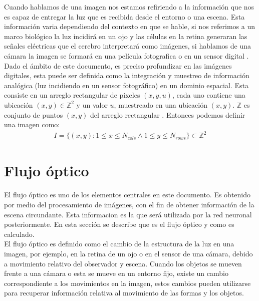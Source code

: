 \documentclass{iccmemoria}
\begin{document}
Cuando hablamos de una imagen nos estamos refiriendo a la información que nos es capaz de entregar la luz que es recibida desde el entorno o una escena. Esta información varia dependiendo del contexto en que se hable, si nos referimos a un marco biológico la luz incidirá en un ojo y las células en la retina generaran las señales eléctricas que el cerebro interpretará como imágenes, si hablamos de una cámara la imagen se formará en una película fotografica o en un sensor digital \cite{bradski2008learning}.\\

Dado el ámbito de este documento, es preciso profundizar en las imágenes digitales, esta puede ser definida como la integración y muestreo de información analógica (luz incidiendo en un sensor fotográfico) en un dominio espacial. Esta consiste en un arreglo rectangular de pixeles $(x, y, u)$, cada uno contiene una ubicación $(x, y) \in \mathbb{Z}^2 $ y un valor $u$, muestreado en una ubicación $(x, y)$. $\mathbb{Z}$ es conjunto de puntos $(x, y)$ del arreglo rectangular \cite{klette2014concise}. Entonces podemos definir una imagen como:
\begin{equation}
	\begin{split}
	I = \lbrace (x, y) : 1 \leq  x \leq N_{cols} \wedge 1 \leq y \leq N_{rows} \rbrace \subset \mathbb{Z}^2
	\end{split}
\end{equation}

\section{Flujo óptico}\label{flujo_optico}

El flujo óptico es uno de los elementos centrales en este documento. Es obtenido por medio del procesamiento de imágenes, con el fin de obtener información de la escena circundante. Esta informacion es la que será utilizada por la red neuronal posteriormente. En esta sección se describe que es el flujo óptico y como es calculado.\\

El flujo óptico es definido como el cambio de la estructura de la luz en una imagen, por ejemplo, en la retina de un ojo o en el sensor de una cámara, debido a movimiento relativo del observador y escena. Cuando los objetos se mueven frente a una cámara o esta se mueve en un entorno fijo, existe un cambio correspondiente a los movimientos en la imagen, estos cambios pueden utilizarse para recuperar información relativa al movimiento de las formas y los objetos.\\
\end{document}

